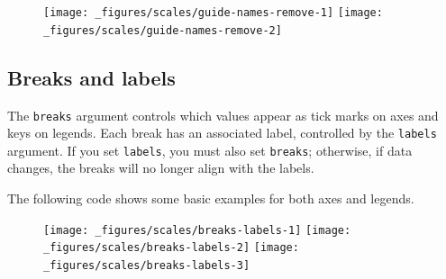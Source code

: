 \begin{figure}[H]
  \texttt{[image: \_figures/scales/guide-names-remove-1]}%
  \texttt{[image: \_figures/scales/guide-names-remove-2]}
\end{figure}

\subsection{Breaks and labels}\label{breaks-and-labels}

The \texttt{breaks} argument controls which values appear as tick marks
on axes and keys on legends. Each break has an associated label,
controlled by the \texttt{labels} argument. If you set \texttt{labels},
you must also set \texttt{breaks}; otherwise, if data changes, the
breaks will no longer align with the labels. 
  

The following code shows some basic examples for both axes and legends.

\begin{Shaded}
\begin{Highlighting}[]
\StringTok{ }\NormalTok{(} \NormalTok{(}\NormalTok{, }\NormalTok{, }\NormalTok{) *}\StringTok{ }\NormalTok{, } \NormalTok{)}
\StringTok{ }\StringTok{ }
\StringTok{  }\NormalTok{() +}\StringTok{ }
\StringTok{  }\NormalTok{(} \NormalTok{, } \NormalTok{)}
\StringTok{ }\NormalTok{(} \NormalTok{(}\NormalTok{, }\NormalTok{))}
\StringTok{ }\NormalTok{(} \NormalTok{(}\NormalTok{, }\NormalTok{), } \NormalTok{(}\NormalTok{, }\NormalTok{))}
\end{Highlighting}
\end{Shaded}

\begin{figure}[H]
  \texttt{[image: \_figures/scales/breaks-labels-1]}%
  \texttt{[image: \_figures/scales/breaks-labels-2]}%
  \texttt{[image: \_figures/scales/breaks-labels-3]}
\end{figure}

